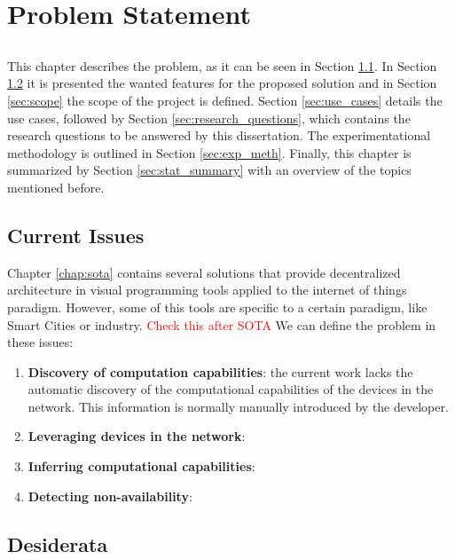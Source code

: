 \chapter{Problem Statement} \label{chap:problem_statement}

\section*{}

This chapter describes the problem, as it can be seen in Section \ref{sec:current_issues}. In Section \ref{sec:disiderata} it is presented the wanted features for the proposed solution and in Section \ref{sec:scope} the scope of the project is defined. Section \ref{sec:use_cases} details the use cases, followed by Section \ref{sec:research_questions}, which contains the research questions to be answered by this dissertation. The experimentational methodology is outlined in Section \ref{sec:exp_meth}. Finally, this chapter is summarized by Section \ref{sec:stat_summary} with an overview of the topics mentioned before.

\section{Current Issues}\label{sec:current_issues}

Chapter \ref{chap:sota} contains several solutions that provide decentralized architecture in visual programming tools applied to the internet of things paradigm. However, some of this tools are specific to a certain paradigm, like Smart Cities or industry. \textcolor{red}{Check this after SOTA}
We can define the problem in these issues:
\begin{enumerate}
    \item \textbf{Discovery of computation capabilities}: the current work lacks the automatic discovery of the computational capabilities of the devices in the network. This information is normally manually introduced by the developer.
    \item \textbf{Leveraging devices in the network}:
    \item \textbf{Inferring computational capabilities}: 
    \item \textbf{Detecting non-availability}:
\end{enumerate}

\section{Desiderata}\label{sec:disiderata}

